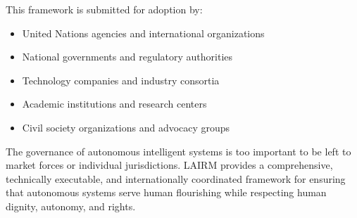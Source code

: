 \documentclass[12pt,a4paper,twoside,openright]{book}
\begin{document}
This framework is submitted for adoption by:

\begin{itemize}
    \item United Nations agencies and international organizations
    \item National governments and regulatory authorities
    \item Technology companies and industry consortia
    \item Academic institutions and research centers
    \item Civil society organizations and advocacy groups
\end{itemize}

The governance of autonomous intelligent systems is too important to be left to market forces or individual jurisdictions. LAIRM provides a comprehensive, technically executable, and internationally coordinated framework for ensuring that autonomous systems serve human flourishing while respecting human dignity, autonomy, and rights.

\backmatter




\cleardoublepage
\printbibliography[heading=bibintoc,title={References and Bibliography}]
\end{document}
